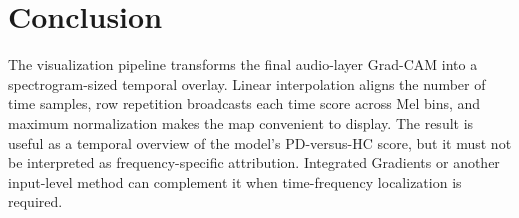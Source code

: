 \documentclass[11pt,a4paper]{article}
\begin{document}
\section{Conclusion}
The visualization pipeline transforms the final audio-layer Grad-CAM into a spectrogram-sized temporal overlay. Linear interpolation aligns the number of time samples, row repetition broadcasts each time score across Mel bins, and maximum normalization makes the map convenient to display. The result is useful as a temporal overview of the model's PD-versus-HC score, but it must not be interpreted as frequency-specific attribution. Integrated Gradients or another input-level method can complement it when time-frequency localization is required.
\end{document}
